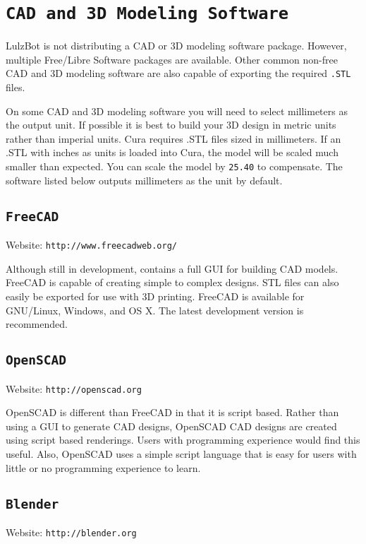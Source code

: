 \section{\texttt{CAD and 3D Modeling Software}}

LulzBot is not distributing a CAD or 3D modeling software package. However, multiple Free/Libre Software packages are available. Other common non-free CAD and 3D modeling software are also capable of exporting the required \texttt{.STL} files.

On some CAD and 3D modeling software you will need to select millimeters as the output unit. If possible it is best to build your 3D design in metric units rather than imperial units. Cura requires .STL files sized in millimeters. If an .STL with inches as units is loaded into Cura, the model will be scaled much smaller than expected. You can scale the model by \texttt{25.40} to compensate. The software listed below outputs millimeters as the unit by default.

\subsection{\texttt{FreeCAD}}
Website: \texttt{http://www.freecadweb.org/}

Although still in development, contains a full GUI for building CAD models. FreeCAD is capable of creating simple to complex designs. STL files can also easily be exported for use with 3D printing. FreeCAD is available for GNU/Linux, Windows, and OS X. The latest development version is recommended.

\subsection{\texttt{OpenSCAD}}
Website: \texttt{http://openscad.org}

OpenSCAD is different than FreeCAD in that it is script based. Rather than using a GUI to generate CAD designs, OpenSCAD CAD designs are created using script based renderings. Users with programming experience would find this useful. Also, OpenSCAD uses a simple script language that is easy for users with little or no programming experience to learn.

\subsection{\texttt{Blender}}
Website: \texttt{http://blender.org}

